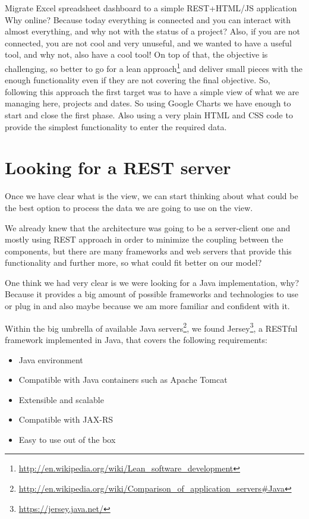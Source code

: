 \begin{part}{Migrate Excel spreadsheet dashboard to a simple REST+HTML/JS
application}
Why online? Because today everything is connected and you can interact with
almost everything, and why not with the status of a project? Also, if you are
not connected, you are not cool and very unuseful, and we wanted to have a
useful tool, and why not, also have a cool tool!  On top of that, the objective
is challenging, so better to go for a lean approach\footnote{\url{http://en.wikipedia.org/wiki/Lean\_software\_development}} and
deliver small pieces with the enough functionality even if they are not covering
the final objective. So, following this approach the first target was to have
a simple view of what we are managing here, projects and dates. So using Google
Charts we have enough to start and close the first phase. Also using a very
plain HTML and CSS code to provide the simplest functionality to enter the
required data.

\section{Looking for a REST server}
Once we have clear what is the view, we can start thinking about what could be
the best option to process the data we are going to use on the view.

We already knew that the architecture was going to be a server-client one and
mostly using REST approach in order to minimize the coupling between the
components, but there are many frameworks and web servers that provide this
functionality and further more, so what could fit better on our model?

One think we had very clear is we were looking for a Java implementation, why?
Because it provides a big amount of possible frameworks and technologies to
use or plug in and also maybe because we am more familiar and confident
with it.

Within the big umbrella of available Java servers\footnote{\url{http://en.wikipedia.org/wiki/Comparison\_of\_application\_servers\#Java}},
we found Jersey\footnote{\url{https://jersey.java.net/}}, a
RESTful framework implemented in Java, that covers the following
requirements:
\begin{itemize}
  \item Java environment
  \item Compatible with Java containers such as Apache Tomcat 
  \item Extensible and scalable
  \item Compatible with JAX-RS
  \item Easy to use out of the box
\end{itemize}


\end{part}
